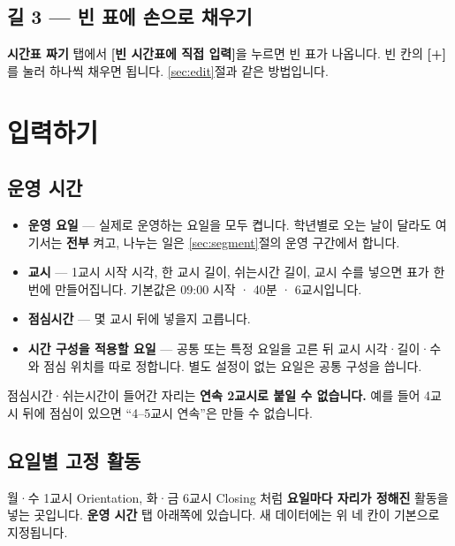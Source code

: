 \documentclass[11pt,a4paper]{article}
\newcommand{\btn}[1]{\textcolor{ttdark}{\sffamily\bfseries[#1]}}   %
\newcommand{\tab}[1]{\textcolor{ttblue}{\sffamily\bfseries#1}}      %
\begin{document}
\subsection{길 3 — 빈 표에 손으로 채우기}

\tab{시간표 짜기} 탭에서 \btn{빈 시간표에 직접 입력}을 누르면 빈 표가 나옵니다.
빈 칸의 \btn{+}를 눌러 하나씩 채우면 됩니다. \ref{sec:edit}절과 같은 방법입니다.

\section{입력하기}

\subsection{운영 시간}

\begin{itemize}
  \item \textbf{운영 요일} — 실제로 운영하는 요일을 모두 켭니다. 학년별로 오는 날이 달라도 여기서는 \textbf{전부} 켜고,
        나누는 일은 \ref{sec:segment}절의 운영 구간에서 합니다.
  \item \textbf{교시} — 1교시 시작 시각, 한 교시 길이, 쉬는시간 길이, 교시 수를 넣으면 표가 한 번에 만들어집니다.
        기본값은 09:00 시작 · 40분 · 6교시입니다.
  \item \textbf{점심시간} — 몇 교시 뒤에 넣을지 고릅니다.
  \item \textbf{시간 구성을 적용할 요일} — 공통 또는 특정 요일을 고른 뒤 교시 시각·길이·수와 점심 위치를 따로 정합니다.
        별도 설정이 없는 요일은 공통 구성을 씁니다.
\end{itemize}

\begin{warn}
점심시간·쉬는시간이 들어간 자리는 \textbf{연속 2교시로 붙일 수 없습니다.}
예를 들어 4교시 뒤에 점심이 있으면 ``4--5교시 연속''은 만들 수 없습니다.
\end{warn}

\subsection{요일별 고정 활동}\label{sec:fixed}

월·수 1교시 Orientation, 화·금 6교시 Closing 처럼 \textbf{요일마다 자리가 정해진} 활동을 넣는 곳입니다.
\tab{운영 시간} 탭 아래쪽에 있습니다. 새 데이터에는 위 네 칸이 기본으로 지정됩니다.
\end{document}
